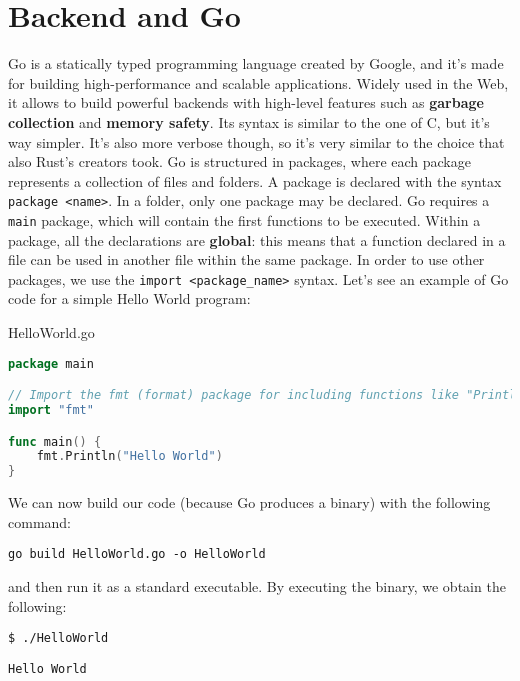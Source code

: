 \chapter{Backend and Go}

Go is a statically typed programming language created by Google, and it's made for building high-performance and scalable applications. Widely used in the Web, it allows to build powerful backends with high-level features such as \textbf{garbage collection} and \textbf{memory safety}. Its syntax is similar to the one of C, but it's way simpler. It's also more verbose though, so it's very similar to the choice that also Rust's creators took.
\nwl
Go is structured in packages, where each package represents a collection of files and folders. A package is declared with the syntax \verb|package <name>|. In a folder, only one package may be declared. Go requires a \verb|main| package, which will contain the first functions to be executed.
\nwl
Within a package, all the declarations are \textbf{global}: this means that a function declared in a file can be used in another file within the same package. In order to use other packages, we use the \verb|import <package_name>| syntax. Let's see an example of Go code for a simple Hello World program:

\begin{codeblock}{HelloWorld.go}
    \begin{lstlisting}[language = go]
package main

// Import the fmt (format) package for including functions like "Println()"
import "fmt"

func main() {
    fmt.Println("Hello World")
}\end{lstlisting}
\end{codeblock}

We can now build our code (because Go produces a binary) with the following command:

\begin{terminal}
    \begin{lstlisting}[style = notexterm]
go build HelloWorld.go -o HelloWorld
    \end{lstlisting}
\end{terminal}

and then run it as a standard executable. By executing the binary, we obtain the following:

\begin{terminal}
    \begin{lstlisting}[style = notexterm]
 $ ./HelloWorld
    \end{lstlisting}
    \begin{tcolorbox}
        \begin{lstlisting}[basewidth=0.44em, numbers=none]
Hello World\end{lstlisting}
    \end{tcolorbox}
\end{terminal}

